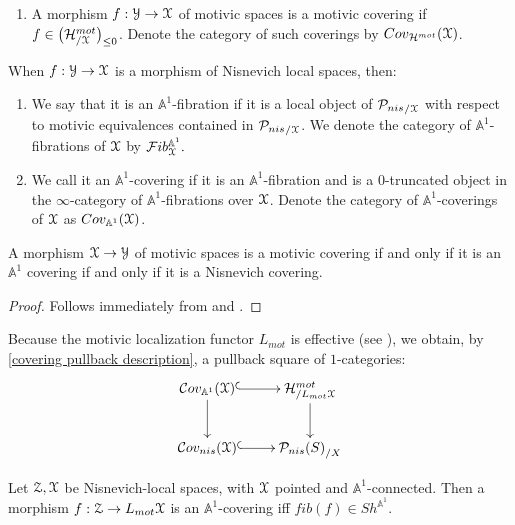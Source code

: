 \begin{defn}
\begin{enumerate}
\item A morphism $f:\EuScript{Y}\to \EuScript{X}$ of motivic spaces is a motivic covering if $f\in \big({\mathcal{H}^{mot}_{/\EuScript{X}}}\big)_{\leq 0}$. Denote the category of such coverings by $Cov_{\mathcal{H}^{mot}}(\EuScript{X})$. 
\end{enumerate}
When $f:\EuScript{Y}\to \EuScript{X}$ is a morphism of Nisnevich local spaces, then:
\begin{enumerate}[resume] 
\item We say that it is an $\mathbb{A}^1$-fibration if it is a local object of ${\mathcal{P}_{nis}}_{/\EuScript{X}}$ with respect to motivic equivalences contained in ${\mathcal{P}_{nis}}_{/\EuScript{X}}$. We denote the category of $\mathbb{A}^1$-fibrations of $\EuScript{X}$ by $\mathcal{F}ib_{\EuScript{X}}^{\mathbb{A}^1}.$
\item We call it an $\mathbb{A}^1$-covering if it is an $\mathbb{A}^1$-fibration and is a $0$-truncated object in the $\infty$-category of $\mathbb{A}^1$-fibrations over $\EuScript{X}$. Denote the category of $\mathbb{A}^1$-coverings of $\EuScript{X}$ as $Cov_{\mathbb{A}^1}(\EuScript{X})$. 
\end{enumerate}
\end{defn}
\begin{prop}
A morphism $\EuScript{X}\to \EuScript{Y}$ of motivic spaces is a motivic covering if and only if it is an $\mathbb{A}^1$ covering if and only if it is a Nisnevich covering.
\end{prop}
\begin{proof}
Follows immediately from  and .
\end{proof}
\begin{rem}
Because the motivic localization functor $L_{mot}$ is effective (see ), we obtain, by \cref{covering pullback description}, a pullback square of $1$-categories:
\[
\xymatrix{
\mathcal{C}ov_{\mathbb{A}^1}(\esc{X})\ar@{^(->}[r]\ar[d]&\mathcal{H}^{mot}_{/L_{mot}\esc{X}}\ar[d]\\
\mathcal{C}ov_{nis}(\esc{X})\ar@{^(->}[r] &{\mathcal{P}_{nis}(S)}_{/X}
}
\]
\end{rem}
\begin{cor}
Let $\EuScript{Z},\EuScript{X}$ be Nisnevich-local spaces, with $\EuScript{X}$ pointed and $\mathbb{A}^1$-connected. Then a morphism $f:\EuScript{Z}\to L_{mot}\EuScript{X}$ is an $\mathbb{A}^1$-covering iff $fib(f)\in Sh^{\mathbb{A}^1}$.
\end{cor}
